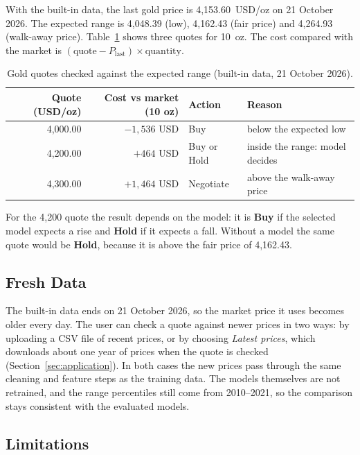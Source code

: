 With the built-in data, the last gold price is 4,153.60~USD/oz on
21 October 2026. The expected range is 4,048.39 (low), 4,162.43 (fair price)
and 4,264.93 (walk-away price). Table~\ref{tab:worked-example} shows three
quotes for 10~oz. The cost compared with the market is
$(\text{quote}-P_{\text{last}})\times\text{quantity}$.

\begin{table}[H]
  \centering
  \begin{tabular}{rrll}
    \toprule
    Quote (USD/oz) & Cost vs market (10 oz) & Action & Reason \\
    \midrule
    4,000.00 & $-1,536$ USD & Buy & below the expected low \\
    4,200.00 & $+464$ USD & Buy or Hold & inside the range: model decides \\
    4,300.00 & $+1,464$ USD & Negotiate & above the walk-away price \\
    \bottomrule
  \end{tabular}
  \caption{Gold quotes checked against the expected range (built-in data, 21 October 2026).}
  \label{tab:worked-example}
\end{table}

For the 4,200 quote the result depends on the model: it is \textbf{Buy} if
the selected model expects a rise and \textbf{Hold} if it expects a fall.
Without a model the same quote would be \textbf{Hold}, because it is above the
fair price of 4,162.43.

\subsection{Fresh Data}

The built-in data ends on 21 October 2026, so the market price it uses
becomes older every day. The user can check a quote against newer prices in
two ways: by uploading a CSV file of recent prices, or by choosing
\emph{Latest prices}, which downloads about one year of prices when the
quote is checked (Section~\ref{sec:application}). In both cases the new
prices pass through the same cleaning and feature steps as the training data.
The models themselves are not retrained, and the range percentiles still come
from 2010--2021, so the comparison stays consistent with the evaluated
models.

\subsection{Limitations}

